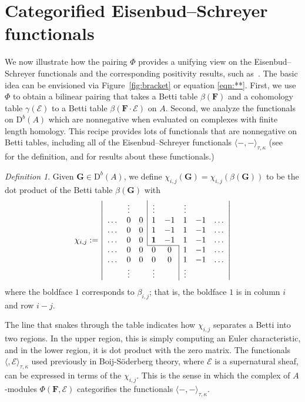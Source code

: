 \documentclass[12pt]{amsart}
\theoremstyle{definition}
\theoremstyle{remark}
\newtheorem{defn}[lemma]{Definition}
\newcommand{\cE}{\mathcal{E}}
\newcommand{\FF}{\mathbf{F}}
\newcommand{\Gbull}{\mathbf{G}}
\newcommand{\DD}{\mathrm{D}}
\begin{document}
\section{Categorified Eisenbud--Schreyer functionals}\label{sec:functionals}
We now illustrate how the pairing $\Phi$ provides a unifying view on the Eisenbud--Schreyer functionals and  the corresponding positivity results, such as~\cite[Positivity 1 and 2]{eis-schrey-icm}.  The basic idea can be envisioned via Figure~\ref{fig:bracket} or equation \eqref{eqn:**}.  First, we use $\Phi$ to obtain a  bilinear pairing that takes a Betti table $\beta(\FF)$ and a cohomology table $\gamma(\cE)$ to a Betti table $\beta(\FF\cdot \cE)$ on $A$.  Second, we analyze the functionals on $\DD^b(A)$ which are nonnegative when evaluated on complexes with finite length homology.  
This recipe provides lots of functionals that are nonnegative on Betti tables, including all of the Eisenbud--Schreyer functionals $\langle -, -\rangle_{\tau,\kappa}$ (see ~\cite{eis-schrey-icm} for the definition, and for results about these functionals.)


\begin{defn}\label{defn:chi}
Given $\Gbull\in \DD^b(A)$, we define $\chi_{i,j}(\Gbull)=\chi_{i,j}(\beta(\Gbull))$ to be the dot product of the Betti table $\beta(\Gbull)$ with
\begin{equation}\label{eqn:chi}
\chi_{i,j}:=
\left|
\begin{array}{cccccccc}
 & \vdots& &\multicolumn{1}{|c}{\vdots}&& \vdots&&\\
\dots&0&0&\multicolumn{1}{|c}{1}&-1&1&-1&\dots\\
\dots&0&0&\multicolumn{1}{|c}{1}&-1&1&-1&\dots\\
\dots&0&0&\multicolumn{1}{|c}{\mathbf{1}}&-1&1&-1&\dots\\ \cline{4-5}
\dots&0&0&0&0&\multicolumn{1}{|c}{1}&-1&\dots\\
\dots&0&0&0&0&\multicolumn{1}{|c}{1}&-1&\dots\\
& \vdots&&\vdots&& \multicolumn{1}{|c}{\vdots}&&\\
\end{array}
\right|
\end{equation}
where the boldface $1$ corresponds to $\beta_{i,j}$; that is, the boldface $1$ is in column $i$ and row $i-j$. 
\end{defn}
The line that snakes through
the table indicates how $\chi_{i,j}$ separates a Betti into two regions.  In the upper region, this is simply computing an Euler characteristic, and in the lower region, it is dot product with the zero matrix. The functionals $\langle , \cE \rangle_{\tau,\kappa}$ used previously in Boij-S\"oderberg theory, where $\cE$ is a supernatural sheaf, can be expressed in terms of the $\chi_{i,j}$. 
This is the sense in which the complex of $A$-modules $\Phi(\FF,\cE)$ categorifies the functionals  $\langle -,-\rangle_{\tau,\kappa}$.
\end{document}
